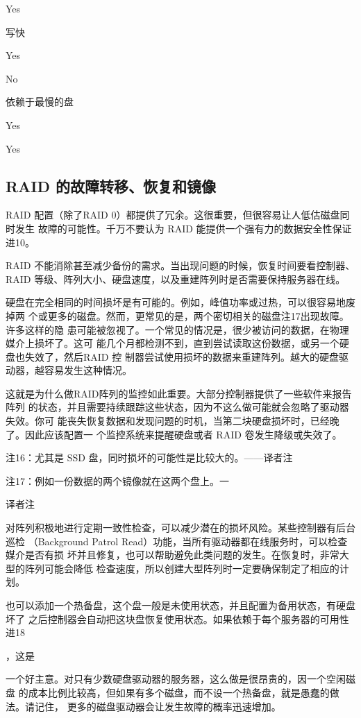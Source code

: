 Yes

写快

Yes

No

依赖于最慢的盘

Yes

Yes

\subsection{RAID 的故障转移、恢复和镜像}
RAID 配置（除了RAID 0）都提供了冗余。这很重要，但很容易让人低估磁盘同时发生
故障的可能性。千万不要认为 RAID 能提供一个强有力的数据安全性保证进10。

RAID 不能消除甚至减少备份的需求。当出现问题的时候，恢复时间要看控制器、RAID
等级、阵列大小、硬盘速度，以及重建阵列时是否需要保持服务器在线。

硬盘在完全相同的时间损坏是有可能的。例如，峰值功率或过热，可以很容易地废掉两
个或更多的磁盘。然而，更常见的是，两个密切相关的磁盘注17出现故障。许多这样的隐
患可能被忽视了。一个常见的情况是，很少被访问的数据，在物理媒介上损坏了。这可
能几个月都检测不到，直到尝试读取这份数据，或另一个硬盘也失效了，然后RAID 控
制器尝试使用损坏的数据来重建阵列。越大的硬盘驱动器，越容易发生这种情况。

这就是为什么做RAID阵列的监控如此重要。大部分控制器提供了一些软件来报告阵列
的状态，并且需要持续跟踪这些状态，因为不这么做可能就会忽略了驱动器失效。你可
能丧失恢复数据和发现问题的时机，当第二块硬盘损坏时，已经晚了。因此应该配置一
个监控系统来提醒硬盘或者 RAID 卷发生降级或失效了。

注16：尤其是 SSD 盘，同时损坏的可能性是比较大的。——译者注

注17：例如一份数据的两个镜像就在这两个盘上。一

译者注

对阵列积极地进行定期一致性检查，可以减少潜在的损坏风险。某些控制器有后台巡检
（Background Patrol Read）功能，当所有驱动器都在线服务时，可以检查媒介是否有损
坏并且修复，也可以帮助避免此类问题的发生。在恢复时，非常大型的阵列可能会降低
检查速度，所以创建大型阵列时一定要确保制定了相应的计划。

也可以添加一个热备盘，这个盘一般是未使用状态，并且配置为备用状态，有硬盘坏了
之后控制器会自动把这块盘恢复使用状态。如果依赖于每个服务器的可用性进18

，这是

一个好主意。对只有少数硬盘驱动器的服务器，这么做是很昂贵的，因一个空闲磁盘
的成本比例比较高，但如果有多个磁盘，而不设一个热备盘，就是愚蠢的做法。请记住，
更多的磁盘驱动器会让发生故障的概率迅速增加。


